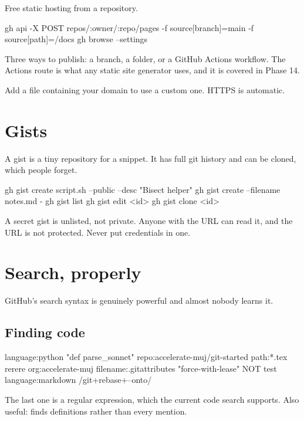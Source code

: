 \documentclass[11pt]{article}
\begin{document}
Free static hosting from a repository.

\begin{shell}
gh api -X POST repos/:owner/:repo/pages -f source[branch]=main -f source[path]=/docs
gh browse --settings
\end{shell}

Three ways to publish: a branch, a  folder, or a GitHub Actions workflow.
The Actions route is what any static site generator uses, and it is covered in Phase
14.

Add a  file containing your domain to use a custom one. HTTPS is automatic.

\section{Gists}

A gist is a tiny repository for a snippet. It has full git history and can be cloned,
which people forget.

\begin{shell}
gh gist create script.sh --public --desc "Bisect helper"
gh gist create --filename notes.md -
gh gist list
gh gist edit <id>
gh gist clone <id>
\end{shell}

\begin{trap}
A secret gist is unlisted, not private. Anyone with the URL can read it, and the URL
is not protected. Never put credentials in one.
\end{trap}

\section{Search, properly}

GitHub's search syntax is genuinely powerful and almost nobody learns it.

\subsection{Finding code}

\begin{terminal}
language:python "def parse_sonnet"
repo:accelerate-muj/git-started path:*.tex rerere
org:accelerate-muj filename:.gitattributes
"force-with-lease" NOT test language:markdown
/git\s+rebase\s+--onto/
\end{terminal}

The last one is a regular expression, which the current code search supports. Also
useful:  finds definitions rather than every mention.
\end{document}

